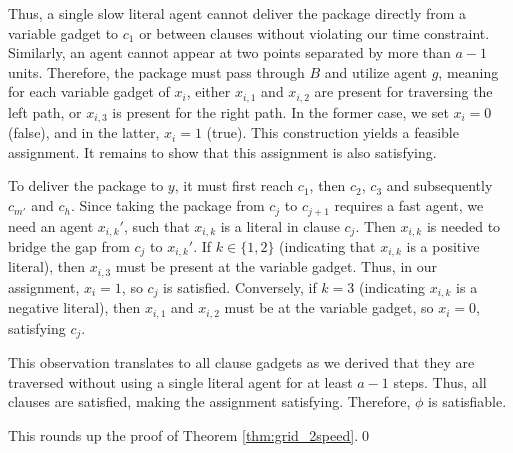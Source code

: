 \begin{enumerate}
Thus, a single slow literal agent cannot deliver the package directly from a variable gadget to $c_1$ or between clauses without violating our time constraint. Similarly, an agent cannot appear at two points separated by more than $a-1$ units.
Therefore, the package must pass through $B$ and utilize agent $g$, meaning for each variable gadget of $x_i$, either $x_{i,1}$ and $x_{i,2}$ are present for traversing the left path, or $x_{i,3}$ is present for the right path. In the former case, we set $x_i = 0$ (false), and in the latter, $x_i = 1$ (true). 
This construction yields a feasible assignment. It remains to show that this assignment is also satisfying.

To deliver the package to $y$, it must first reach $c_1$, then $c_2$, $c_3$ and subsequently $c_{m'}$ and $c_h$. Since taking the package from $c_{j}$ to $c_{j+1}$ requires a fast agent, we need an agent $x_{i, k}'$, such that $x_{i, k}$ is a literal in clause $c_j$. Then $x_{i, k}$ is needed to bridge the gap from $c_{j}$ to $x_{i,k}'$. 
If $k \in \{1, 2\}$ (indicating that $x_{i, k}$ is a positive literal), then $x_{i,3}$ must be present at the variable gadget. Thus, in our assignment, $x_i = 1$, so $c_{j}$ is satisfied. Conversely, if $k = 3$ (indicating $x_{i, k}$ is a negative literal), then $x_{i,1}$ and $x_{i,2}$ must be at the variable gadget, so $x_i = 0$, satisfying $c_j$. 

This observation translates to all clause gadgets as we derived that they are traversed without using a single literal agent for at least $a-1$ steps. Thus, all clauses are satisfied, making the assignment satisfying. Therefore, $\phi$ is satisfiable.

\end{enumerate}
This rounds up the proof of Theorem \ref{thm:grid_2speed}.\qed


